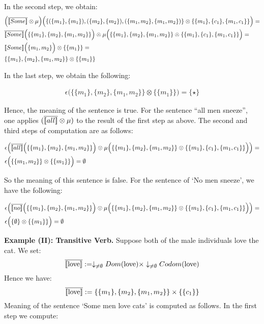 \noindent
In the second step, we obtain:
\begin{align*}
&\Big(\overline{[\![ Some ]\!]} \otimes \mu\Big) \Big ( \{(\{m_1\}, \{m_1\}), (\{m_2\}, \{m_2\}), (\{m_1, m_2\}, \{m_1, m_2\}) \} \otimes  \{\{m_1\}, \{c_1\}, \{m_1, c_1\}\}  \Big) =\\
&\overline{[\![ Some ]\!]}\Big (\{\{m_1\}, \{m_2\}, \{m_1, m_2\}\} \Big) \otimes \mu \Big( \{\{m_1\}, \{m_2\}, \{m_1, m_2\}\}  \otimes \{\{m_1\}, \{c_1\}, \{m_1, c_1\}\} \Big)=\\
&{[\![ Some ]\!]}\Big (\{m_1, m_2\} \Big) \otimes\{\{m_1\}\}=\\
&\{\{m_1\}, \{m_2\}, \{m_1, m_2\}\}  \otimes \{\{m_1\}\}
\end{align*}

\noindent
In the last step, we obtain the following:

\begin{align*}
\epsilon\Big(\{\{m_1\}, \{m_2\}, \{m_1, m_2\}\}  \otimes \{\{m_1\}\}\Big) = \{\star\}
\end{align*}

\noindent
Hence, the meaning of the sentence is true.  For the sentence ``all men sneeze'',  one applies $(\overline{[\![ all ]\!]} \otimes \mu)$ to the result of the first step as above. The second and third steps of computation are as follows:

\begin{align*}
&\epsilon   \Big(\overline{[\![ all ]\!]}\Big ( \{\{m_1\}, \{m_2\}, \{m_1, m_2\}\} \Big) \otimes \mu \Big( \{\{m_1\}, \{m_2\}, \{m_1, m_2\}\}  \otimes \{\{m_1\}, \{c_1\}, \{m_1, c_1\}\} \Big)  \Big) =\\
&\epsilon \Big(\{\{m_1, m_2\}\}  \otimes \{\{m_1\}\}\Big) = \emptyset
\end{align*}

\noindent
So the meaning of this sentence is false.   For the sentence of `No men sneeze',  we have the following:

\begin{align*}
&\epsilon   \Big(\overline{[\![ no ]\!]}\Big ( \{\{m_1\}, \{m_2\}, \{m_1, m_2\}\} \Big) \otimes \mu \Big( \{\{m_1\}, \{m_2\}, \{m_1, m_2\}\}  \otimes \{\{m_1\}, \{c_1\}, \{m_1, c_1\}\} \Big)  \Big) =\\
&\epsilon \Big(\{\emptyset\}  \otimes \{\{m_1\}\}\Big) = \emptyset
\end{align*}


\bigskip
\noindent
{\bf Example (II): Transitive Verb.} Suppose both of  the male individuals love the cat. We set:
\[
\overline{[\![ \text{love} ]\!]} := \downarrow_{\neq \emptyset} Dom(\text{love}) \times \downarrow_{\neq \emptyset} Codom(\text{love})
\] 
Hence we have:
\[
\overline{[\![ \text{love} ]\!]} := \{\{m_1\}, \{m_2\}, \{m_1, m_2\}\} \times \{\{c_1\}\}
\]
Meaning of the sentence `Some men love cats' is computed as follows. In the first step we compute:

